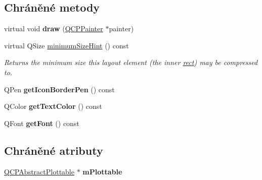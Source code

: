 \subsection*{Chráněné metody}
\begin{DoxyCompactItemize}
\item 
\hypertarget{classQCPPlottableLegendItem_a68a781c3de4f9959fdf82075052d43aa}{}virtual void {\bfseries draw} (\hyperlink{classQCPPainter}{Q\+C\+P\+Painter} $\ast$painter)\label{classQCPPlottableLegendItem_a68a781c3de4f9959fdf82075052d43aa}

\item 
virtual Q\+Size \hyperlink{classQCPPlottableLegendItem_a76bad654ebc8e870392f488419a6a483}{minimum\+Size\+Hint} () const 
\begin{DoxyCompactList}\small\item\em Returns the minimum size this layout element (the inner \hyperlink{classQCPLayoutElement_affdfea003469aac3d0fac5f4e06171bc}{rect}) may be compressed to. \end{DoxyCompactList}\item 
\hypertarget{classQCPPlottableLegendItem_ab36270e6b022a6961fa44136f35c0e4b}{}Q\+Pen {\bfseries get\+Icon\+Border\+Pen} () const \label{classQCPPlottableLegendItem_ab36270e6b022a6961fa44136f35c0e4b}

\item 
\hypertarget{classQCPPlottableLegendItem_ad762b07439c738660ba93e78c1d03667}{}Q\+Color {\bfseries get\+Text\+Color} () const \label{classQCPPlottableLegendItem_ad762b07439c738660ba93e78c1d03667}

\item 
\hypertarget{classQCPPlottableLegendItem_a8a85c8a25affb4895423d730164d61de}{}Q\+Font {\bfseries get\+Font} () const \label{classQCPPlottableLegendItem_a8a85c8a25affb4895423d730164d61de}

\end{DoxyCompactItemize}
\subsection*{Chráněné atributy}
\begin{DoxyCompactItemize}
\item 
\hypertarget{classQCPPlottableLegendItem_ada647fb4b22971a1a424e15b4f6af0d9}{}\hyperlink{classQCPAbstractPlottable}{Q\+C\+P\+Abstract\+Plottable} $\ast$ {\bfseries m\+Plottable}\label{classQCPPlottableLegendItem_ada647fb4b22971a1a424e15b4f6af0d9}

\end{DoxyCompactItemize}
